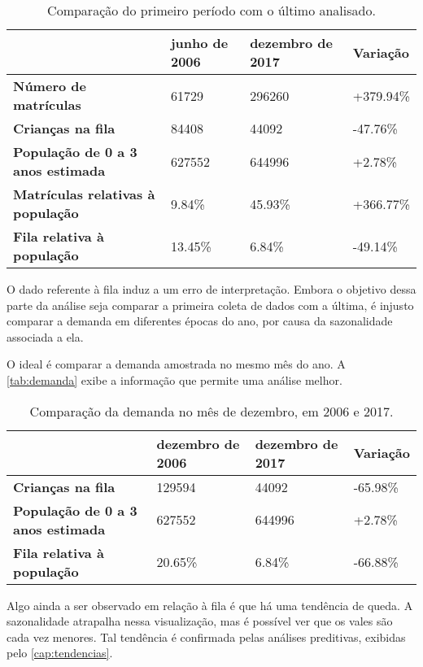 \begin{table}[H]
	\begin{tabular}{l|l|l|l}
		\textbf{}                                 & \textbf{junho de 2006} & \textbf{dezembro de 2017} & \textbf{Variação} \\ \hline
		\textbf{Número de matrículas}             & 61729                  & 296260                    & +379.94\%       \\ \hline
		\textbf{Crianças na fila}                 & 84408                  & 44092                     & -47.76\%        \\ \hline
		\textbf{População de 0 a 3 anos estimada} & 627552                 & 644996                    & +2.78\%         \\ \hline
		\textbf{Matrículas relativas à população} & 9.84\%              & 45.93\%               & +366.77\%       \\ \hline
		\textbf{Fila relativa à população}        & 13.45\%             & 6.84\%                 & -49.14\%        \\
	\end{tabular}
	\caption{Comparação do primeiro período com o último analisado.}
	\label{tab:saopaulo}
\end{table}

O dado referente à fila induz a um erro de interpretação. Embora o objetivo dessa parte da análise seja comparar a primeira coleta de dados com a última, é injusto comparar a demanda em diferentes épocas do ano, por causa da sazonalidade associada a ela.

O ideal é comparar a demanda amostrada no mesmo mês do ano. A \autoref{tab:demanda} exibe a informação que permite uma análise melhor.

\begin{table}[H]
	\begin{tabular}{l|l|l|l}
		\textbf{}                                 & \textbf{dezembro de 2006} & \textbf{dezembro de 2017} & \textbf{Variação} \\ \hline
		\textbf{Crianças na fila}                 & 129594                    & 44092                     & -65.98\%       \\ \hline
		\textbf{População de 0 a 3 anos estimada} & 627552                    & 644996                    & +2.78\%        \\ \hline
		\textbf{Fila relativa à população}        & 20.65\%               & 6.84\%                  & -66.88\%        \\ 
	\end{tabular}
	\caption{Comparação da demanda no mês de dezembro, em 2006 e 2017.}
	\label{tab:demanda}
\end{table}

Algo ainda a ser observado em relação à fila é que há uma tendência de queda. A sazonalidade atrapalha nessa visualização, mas é possível ver que os vales são cada vez menores. Tal tendência é confirmada pelas análises preditivas, exibidas pelo \autoref{cap:tendencias}.